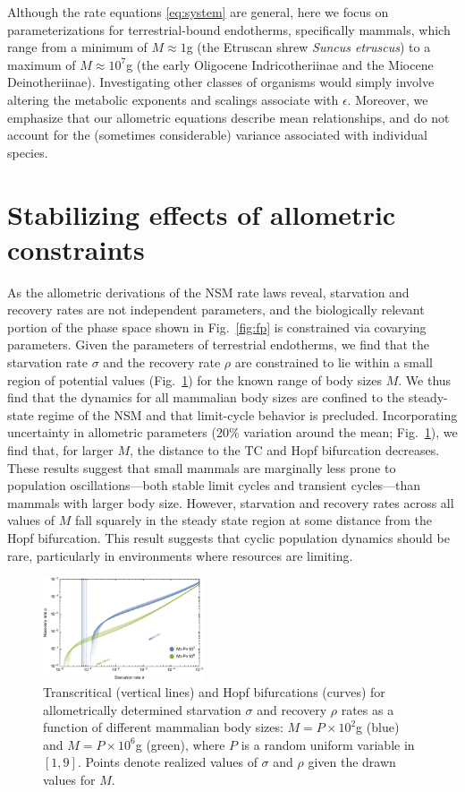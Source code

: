 \documentclass[twocolumn,preprintnumbers,amsmath,amssymb,superscriptaddress]{revtex4}
\begin{document}
\begin{bibunit}[unsrt]
Although the rate equations \eqref{eq:system} are general, here we focus on parameterizations for terrestrial-bound endotherms, specifically mammals, which range from a minimum of $M\approx1$g (the Etruscan shrew \emph{Suncus etruscus}) to a maximum of $M\approx10^7$g (the early Oligocene Indricotheriinae and the Miocene Deinotheriinae).
Investigating other classes of organisms would simply involve altering the metabolic exponents and scalings associate with $\epsilon$. Moreover, we emphasize that our allometric equations describe mean relationships, and do not account for the (sometimes considerable) variance associated with individual species.


\section*{Stabilizing effects of allometric constraints}
As the allometric derivations of the NSM rate laws reveal, starvation and recovery rates are not independent parameters, and the biologically relevant portion of the phase space shown in Fig.~\ref{fig:fp} is constrained via covarying parameters.
Given the parameters of terrestrial endotherms, we find that the starvation rate $\sigma$ and the recovery rate $\rho$ are constrained to lie within a small region of potential values (Fig.~\ref{fig:hopf}) for the known range of body sizes $M$.
We thus find that the dynamics for all mammalian body sizes are confined to the steady-state regime of the NSM and that limit-cycle behavior is precluded.
Incorporating uncertainty in allometric parameters (20\% variation around the mean; Fig.~\ref{fig:hopf}), we find that, for larger $M$, the distance to the TC and Hopf bifurcation decreases.
These results suggest that small mammals are marginally less prone to population oscillations---both stable limit cycles and transient cycles---than mammals with larger body size.  However, starvation and recovery rates across all values of $M$ fall squarely in the steady state region at some distance from the Hopf bifurcation. This result suggests that cyclic population dynamics should be rare, particularly in environments where resources are limiting.

\begin{figure}
\centering
\includegraphics[width=0.425\textwidth]{fig_DataHopf.pdf}
\caption{ Transcritical (vertical lines) and Hopf bifurcations (curves) for
  allometrically determined starvation $\sigma$ and recovery $\rho$ rates as
  a function of different mammalian body sizes: $M=P\times10^2$g (blue) and
  $M=P\times10^6$g (green), where $P$ is a random uniform variable in $[1,9]$.
  Points denote realized values of $\sigma$ and $\rho$ given the drawn values for $M$.
  }
\label{fig:hopf}
\end{figure}



\end{bibunit}
\end{document}
